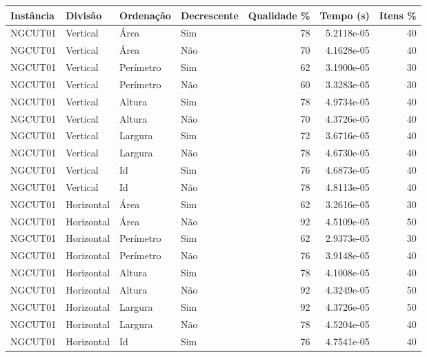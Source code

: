 \begin{tabular}{llllrrr}
\hline
Instância & Divisão     & Ordenação & Decrescente & Qualidade \% & Tempo (s)  & Itens \% \\
\hline
NGCUT01   & Vertical    & Área      & Sim         & 78           & 5.2118e-05 & 40       \\
NGCUT01   & Vertical    & Área      & Não         & 70           & 4.1628e-05 & 40       \\
NGCUT01   & Vertical    & Perímetro & Sim         & 62           & 3.1900e-05 & 30       \\
NGCUT01   & Vertical    & Perímetro & Não         & 60           & 3.3283e-05 & 30       \\
NGCUT01   & Vertical    & Altura    & Sim         & 78           & 4.9734e-05 & 40       \\
NGCUT01   & Vertical    & Altura    & Não         & 70           & 4.3726e-05 & 40       \\
NGCUT01   & Vertical    & Largura   & Sim         & 72           & 3.6716e-05 & 40       \\
NGCUT01   & Vertical    & Largura   & Não         & 78           & 4.6730e-05 & 40       \\
NGCUT01   & Vertical    & Id        & Sim         & 76           & 4.6873e-05 & 40       \\
NGCUT01   & Vertical    & Id        & Não         & 78           & 4.8113e-05 & 40       \\
NGCUT01   & Horizontal  & Área      & Sim         & 62           & 3.2616e-05 & 30       \\
NGCUT01   & Horizontal  & Área      & Não         & 92           & 4.5109e-05 & 50       \\
NGCUT01   & Horizontal  & Perímetro & Sim         & 62           & 2.9373e-05 & 30       \\
NGCUT01   & Horizontal  & Perímetro & Não         & 76           & 3.9148e-05 & 40       \\
NGCUT01   & Horizontal  & Altura    & Sim         & 78           & 4.1008e-05 & 40       \\
NGCUT01   & Horizontal  & Altura    & Não         & 92           & 4.3249e-05 & 50       \\
NGCUT01   & Horizontal  & Largura   & Sim         & 92           & 4.3726e-05 & 50       \\
NGCUT01   & Horizontal  & Largura   & Não         & 78           & 4.5204e-05 & 40       \\
NGCUT01   & Horizontal  & Id        & Sim         & 76           & 4.7541e-05 & 40       \\

\end{tabular}
